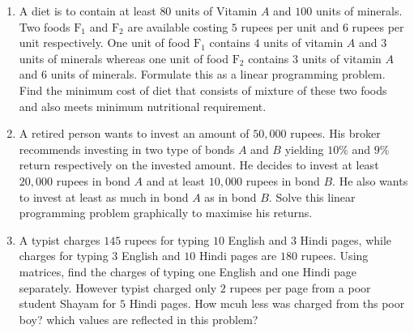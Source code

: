 \begin{enumerate}
	\item A diet is to contain at least $80$ units of Vitamin $A$ and $100$ units of minerals. 
Two foods $\text{F}_1$ and $\text{F}_2$ are available costing $5$ rupees per unit and $6$ rupees per unit respectively. 
One unit of food $\text{F}_1$ contains $4$ units of vitamin $A$ and $3$ units of minerals whereas
 one unit of food $\text{F}_2$ contains $3$ units of vitamin $A$ and $6$ units of minerals. 
 Formulate this as a linear programming problem. Find the minimum cost of diet that consists of mixture of these two foods and also meets minimum nutritional requirement.
 
 
 	\item  A retired person wants to invest an amount of $50,000$ rupees. His broker recommends investing in two type of bonds $A$ and $B$ yielding $10\%$ and $9\%$ return respectively on the invested amount. He decides to invest at least
$20,000$ rupees in bond $A$ and at least $10,000$ rupees in bond $B$. He also wants to invest at least as much in bond $A$ as in bond $B$. Solve this linear programming problem graphically to maximise his returns.

	\item A typist charges $145$ rupees for typing $10$ English and $3$ Hindi pages, while charges for typing $3$ English and $10$ Hindi pages are $180$ rupees. Using matrices, 
find the charges of typing one English and one Hindi page separately. 
However typist charged only $2$ rupees per page from a poor student Shayam for $5$ Hindi pages.
How mcuh less was charged from ths poor boy? which values are reflected in this problem?

\end{enumerate}
